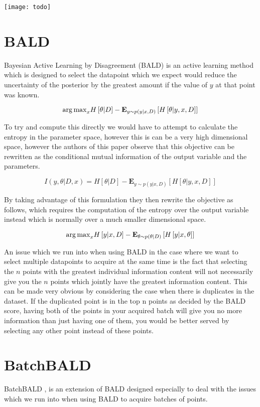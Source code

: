 \documentclass[12pt, a4paper]{report}
\theoremstyle{definition}
\theoremstyle{definition}
\theoremstyle{definition}
\begin{document}
\texttt{[image: todo]}


\section{BALD}
Bayesian Active Learning by Disagreement (BALD) \cite{houlsby2011bayesian} is an active learning method which is designed to select the datapoint which we expect would reduce the uncertainty of the posterior by the greatest amount if the value of $y$ at that point was known.


$${\operatorname*{arg\,max}}_x H \left[ \theta | D \right] - \mathbf{E}_{y \sim p(y | x, D)} \left[ H\left[ \theta | y, x, D\right]\right]$$

To try and compute this directly we would have to attempt to calculate the entropy in the parameter space, however this is can be a very high dimensional space, however the authors of this paper observe that this objective can be rewritten as the conditional mutual information of the output variable and the parameters.

$$I \left(y, \theta| D, x \right) = H \left[ \theta | D \right] - \mathbf{E}_{y \sim p(y | x, D)} \left[ H\left[ \theta | y, x, D\right]\right]$$



By taking advantage of this formulation they then rewrite the objective as follows, which requires the computation of the entropy over the output variable instead which is normally over a much smaller dimensional space.


$${\operatorname*{arg\,max}}_x H \left[ y | x, D \right] - \mathbf{E}_{\theta \sim p(\theta | D)} \left[ H\left[ y | x, \theta \right]\right]$$


An issue which we run into when using BALD in the case where we want to select multiple datapoints to acquire at the same time is the fact that selecting the $n$ points with the greatest individual information content will not necessarily give you the $n$ points which jointly have the greatest information content. This can be made very obvious by considering the case when there is duplicates in the dataset. If the duplicated point is in the top n points as decided by the BALD score, having both of the points in your acquired batch will give you no more information than just having one of them, you would be better served by selecting any other point instead of these points.

\section{BatchBALD}
BatchBALD \cite{kirsch2019batchbald}, is an extension of BALD designed especially to deal with the issues which we run into when using BALD to acquire batches of points.
\end{document}
